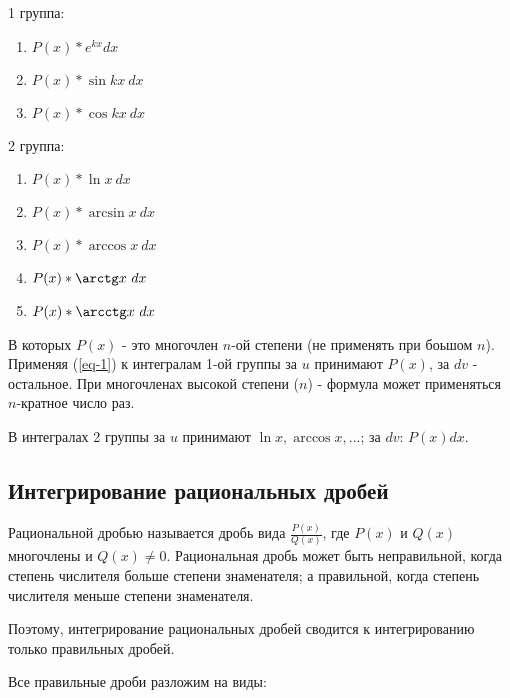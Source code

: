 \documentclass[12pt,a4paper]{article}
\begin{document}
1 группа:
\begin{enumerate}[leftmargin=*, itemsep=0.4ex, before={\everymath{\displaystyle}}]%
\item{$P(x) * e^{kx} dx$}
\item{$P(x) * \sin kx\ dx$}
\item{$P(x) * \cos kx\ dx$}
\end{enumerate}

2 группа:
\begin{enumerate}[leftmargin=*, itemsep=0.4ex, before={\everymath{\displaystyle}}]%
\item{$P(x) * \ln x\ dx$}
\item{$P(x) * \arcsin x\ dx$}
\item{$P(x) * \arccos x\ dx$}
\item{$P(x) * \arctg x\ dx$}
\item{$P(x) * \arcctg x\ dx$}
\end{enumerate}

В которых $P(x)$ - это многочлен $n$-ой степени (не применять при
боьшом $n$).
Применяя (\ref{eq-1}) к интегралам 1-ой группы за $u$ принимают
$P(x)$, за $dv$ - остальное.
При многочленах высокой степени ($n$) - формула может
применяться $n$-кратное число раз.

В интегралах 2 группы за $u$ принимают $\ln x, \arccos x,...$;
за $dv$: $P(x) dx$.
\subsection{Интегрирование рациональных дробей}
Рациональной дробью называется дробь вида $\frac{P(x)}{Q(x)}$, где
$P(x)$ и $Q(x)$ многочлены и $Q(x) \neq 0$.
Рациональная дробь может быть неправильной, когда степень числителя
больше степени знаменателя; а правильной, когда степень
числителя меньше степени знаменателя.

Поэтому, интегрирование рациональных дробей сводится к
интегрированию только правильных дробей.

Все правильные дроби разложим на виды:
\end{document}
